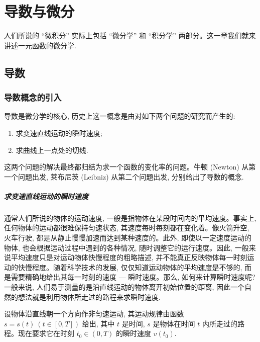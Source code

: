 \setcounter{chapter}{3} %
\chapter{导数与微分}
\label{chap:ma-4}

人们所说的 ``微积分'' 实际上包括 ``微分学'' 和 ``积分学'' 两部分。这一章我们就来讲述一元函数的微分学.

\section{导数}
\label{sec:ma-4-1}

\subsection{导数概念的引入}
\label{subsec:ma-4-1-1}

导数是微分学的核心, 历史上这一概念是由对如下两个问题的研究而产生的:
\begin{enumerate}
  \item 求变速直线运动的瞬时速度;
  \item 求曲线上一点处的切线.
\end{enumerate}
这两个问题的解决最终都归结为求一个函数的变化率的问题。牛顿 (Newton) 从第一个问题出发, 莱布尼茨 (Leibniz) 从第二个问题出发, 分别给出了导数的概念.

\paragraph*{求变速直线运动的瞬时速度}


通常人们所说的物体的运动速度, 一般是指物体在某段时间内的平均速度。事实上, 任何物体的运动都很难保持匀速状态, 其速度每时每刻都在变化着。像火箭升空, 火车行驶, 都是从静止慢慢加速而达到某种速度的。此外, 即使以一定速度运动的物体, 也会根据运动过程中遇到的各种情况, 随时调整它的运行速度。因此, 一般来说平均速度只是对运动物体快慢程度的粗略描述, 并不能真正反映物体每一时刻运动的快慢程度。随着科学技术的发展, 仅仅知道运动物体的平均速度是不够的, 而是需要精确地给出其每一时刻的速度 --- 瞬时速度。那么, 如何来计算瞬时速度呢? 一般来说, 人们易于测量的是沿直线运动的物体离开初始位置的距离, 因此一个自然的想法就是利用物体所走过的路程来求瞬时速度.

设物体沿直线朝一个方向作非匀速运动, 其运动规律由函数 $s=s(t)\ (t\in[0,T])$ 给出, 其中 $t$ 是时间, $s$ 是物体在时间 $t$ 内所走过的路程。现在要求它在时刻 $t_0\in(0,T)$ 的瞬时速度 $v(t_0)$.

